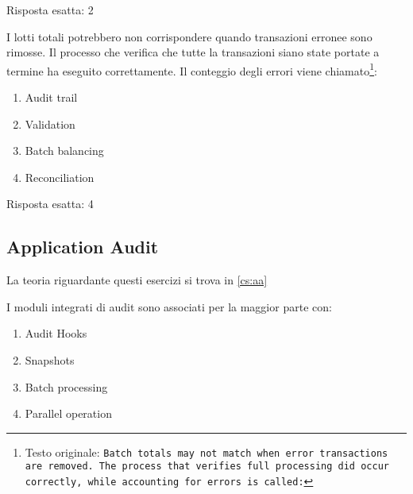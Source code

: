 \begin{Answer} [
  ref={esCs2},
  number={2}
  ]

  \Question Risposta esatta: 2
\end{Answer}

\begin{Exercise} [
  title={Quiz},
  label={esCs3}
  ]

  \Question I lotti totali potrebbero non corrispondere quando transazioni
erronee sono rimosse. Il processo che verifica che tutte la transazioni siano
state portate a termine ha eseguito correttamente. Il conteggio degli errori
viene chiamato\footnote{Testo originale: \texttt{Batch totals may not match when
error transactions are removed. The process that verifies full processing did
occur correctly, while accounting for errors is called:}}:

\begin{enumerate}
\item Audit trail
\item Validation
\item Batch balancing
\item Reconciliation
\end{enumerate}


\end{Exercise}

\begin{Answer} [
  ref={esCs3},
  number={3}
  ]

  \Question Risposta esatta: 4
\end{Answer}


\subsection{Application Audit}
\label{esCs:aa}

La teoria riguardante questi esercizi si trova in \ref{cs:aa}


\begin{Exercise} [
  title={Quiz},
  label={esCs4}
  ]

  \Question I moduli integrati di audit sono associati per la maggior parte con:
\begin{enumerate}
\item Audit Hooks
\item Snapshots
\item Batch processing
\item Parallel operation
\end{enumerate}



\end{Exercise}

